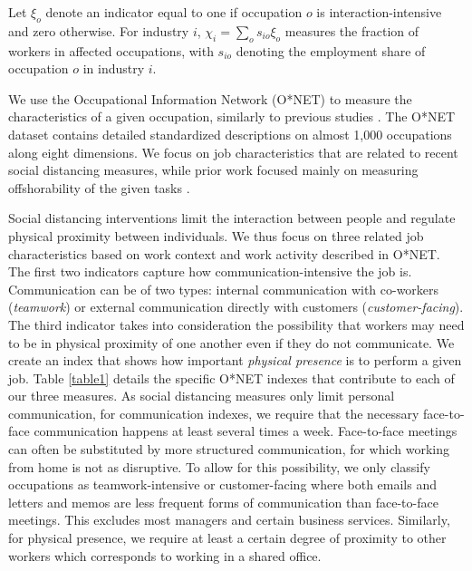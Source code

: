 \documentclass[10pt,letterpaper]{article}
\begin{document}
Let $\xi_o$ denote an indicator equal to one if occupation $o$ is interaction-intensive and zero otherwise. For industry $i$, $\chi_i = \sum_o s_{io}\xi_o$ measures the fraction of workers in affected occupations, with $s_{io}$ denoting the employment share of occupation $o$ in industry $i$.

We use the Occupational Information Network (O*NET) \cite{National_Center_for_ONET_Development2020-wj} to measure the characteristics of a given occupation, similarly to previous studies \cite{Firpo2011-hp,Autor2013-sh,Jin2020-tq,Dingel2020-lh,Leibovici2020-qr,Mongey2020-qc}. The O*NET dataset contains detailed standardized descriptions on almost 1,000 occupations along eight dimensions. We focus on job characteristics that are related to recent social distancing measures, while prior work focused mainly on measuring offshorability of the given tasks \cite{Firpo2011-hp,Autor2013-sh}.

Social distancing interventions limit the interaction between people and regulate physical proximity between individuals. We thus focus on three related job characteristics based on work context and work activity described in O*NET. The first two indicators capture how communication-intensive the job is. Communication can be of two types: internal communication with co-workers (\emph{teamwork}) or external communication directly with customers (\emph{customer-facing}). The third indicator takes into consideration the possibility that workers may need to be in physical proximity of one another even if they do not communicate. We create an index that shows how important \emph{physical presence} is to perform a given job. Table \ref{table1} details the specific O*NET indexes that contribute to each of our three measures.
As social distancing measures only limit personal communication, for communication indexes, we require that the necessary face-to-face communication happens at least several times a week. Face-to-face meetings can often be substituted by more structured communication, for which working from home is not as disruptive. To allow for this possibility, we only classify occupations as teamwork-intensive or customer-facing where both emails and letters and memos are less frequent forms of communication than face-to-face meetings. This excludes most managers and certain business services. Similarly, for physical presence, we require at least a certain degree of proximity to other workers which corresponds to working in a shared office.
\end{document}
